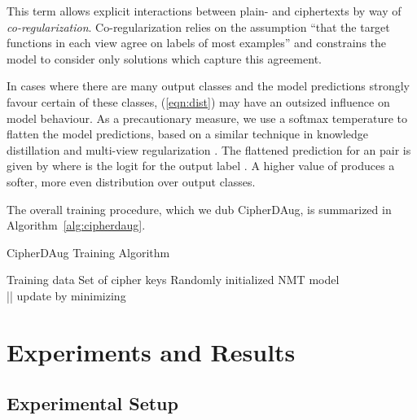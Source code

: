 \documentclass[11pt]{article}
\begin{document}
This term allows explicit interactions between plain- and ciphertexts by way of \textit{co-regularization}. Co-regularization relies on the assumption ``that the target functions in each view agree on labels of most examples'' \cite{sindhwani2005co} and constrains the model to consider only solutions which capture this agreement.


In cases where there are many output classes and the model predictions strongly favour certain of these classes, (\ref{eqn:dist}) may have an outsized influence on model behaviour. As a precautionary measure, we use a softmax temperature  to flatten the model predictions, based on a similar technique in knowledge distillation \cite{hinton2015distilling} and multi-view regularization \cite{wang-etal-2021-multi-view}. The flattened prediction for an  pair is given by 
where  is the logit for the output label . A higher value of  produces a softer, more even distribution over output classes.




The overall training procedure, which we dub CipherDAug, is summarized in Algorithm~\ref{alg:cipherdaug}.

\begin{algorithm}
\small
\caption{CipherDAug Training Algorithm}\label{alg:cipherdaug}
\begin{algorithmic}
\State Training data 
\State Set of cipher keys  
\State Randomly initialized NMT model  \\


\State   {}
 
\State 
\State  {} 
\State {}
\State    \State    \State    || 
\State {}
\State update  by minimizing   
\EndFor
\EndWhile

\EndProcedure

\end{algorithmic}
\end{algorithm}

\section{Experiments and Results}
\subsection{Experimental Setup}
\end{document}
